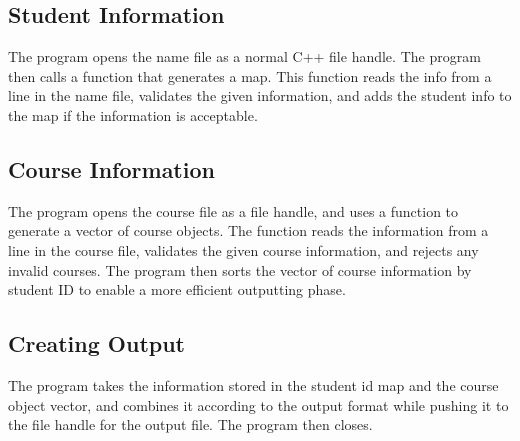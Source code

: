 \documentclass{article}
\begin{document}
\subsection{Student Information}
The program opens the name file as a normal C++ file handle. The program then calls a function that generates a map. This function reads the info from a line in the name file, validates the given information, and adds the student info to the map if the information is acceptable. 

\subsection{Course Information}
The program opens the course file as a file handle, and uses a function to generate a vector of course objects. The function reads the information from a line in the course file, validates the given course information, and rejects any invalid courses. The program then sorts the vector of course information by student ID to enable a more efficient outputting phase.

\subsection{Creating Output}
The program takes the information stored in the student id map and the course object vector, and combines it according to the output format while pushing it to the file handle for the output file. The program then closes.
\end{document}

